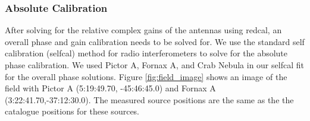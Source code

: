 \documentclass[twocolumn,numberedappendix]{emulateapj} \shorttitle{PSA64}
\begin{document}
\subsubsection{Absolute Calibration} 
%

After solving for the relative complex gains of the antennas using redcal, an
overall phase and gain calibration needs to be solved for. We use the standard self
calibration (selfcal) method for radio interferometers to solve for the absolute
phase calibration. We used Pictor A, Fornax A, and Crab Nebula in our selfcal
fit for the overall phase solutions. Figure \ref{fig:field_image} shows an image
of the field with Pictor A (5:19:49.70, -45:46:45.0)  and Fornax A
(3:22:41.70,-37:12:30.0). The measured source positions are the same as the the
catalogue positions for these sources.



%      
%
%
\end{document}
